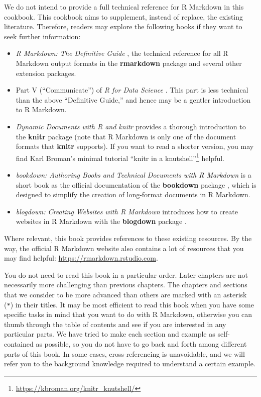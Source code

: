 \documentclass[
  11pt,
]{krantz}
\renewcommand{\href}[2]{#2\footnote{\url{#1}}}
\begin{document}
We do not intend to provide a full technical reference for R Markdown in this cookbook. This cookbook aims to supplement, instead of replace, the existing literature. Therefore, readers may explore the following books if they want to seek further information:

\begin{itemize}
\item
  \emph{R Markdown: The Definitive Guide} \citep{rmarkdown2018}, the technical reference for all R Markdown output formats in the \textbf{rmarkdown} package and several other extension packages.
\item
  Part V (``Communicate'') of \emph{R for Data Science} \citep{wickham2016}. This part is less technical than the above ``Definitive Guide,'' and hence may be a gentler introduction to R Markdown.
\item
  \emph{Dynamic Documents with R and knitr} \citep{knitr2015} provides a thorough introduction to the \textbf{knitr} package \citep{R-knitr} (note that R Markdown is only one of the document formats that \textbf{knitr} supports). If you want to read a shorter version, you may find Karl Broman's minimal tutorial \href{https://kbroman.org/knitr_knutshell/}{``knitr in a knutshell''} helpful.
\item
  \emph{bookdown: Authoring Books and Technical Documents with R Markdown} \citep{bookdown2016} is a short book as the official documentation of the \textbf{bookdown} package \citep{R-bookdown}, which is designed to simplify the creation of long-format documents in R Markdown.
\item
  \emph{blogdown: Creating Websites with R Markdown} \citep{blogdown2017} introduces how to create websites in R Markdown with the \textbf{blogdown} package \citep{R-blogdown}.
\end{itemize}

Where relevant, this book provides references to these existing resources. By the way, the official R Markdown website also contains a lot of resources that you may find helpful: \url{https://rmarkdown.rstudio.com}.

You do not need to read this book in a particular order. Later chapters are not necessarily more challenging than previous chapters. The chapters and sections that we consider to be more advanced than others are marked with an asterisk (\texttt{*}) in their titles. It may be most efficient to read this book when you have some specific tasks in mind that you want to do with R Markdown, otherwise you can thumb through the table of contents and see if you are interested in any particular parts. We have tried to make each section and example as self-contained as possible, so you do not have to go back and forth among different parts of this book. In some cases, cross-referencing is unavoidable, and we will refer you to the background knowledge required to understand a certain example.
\end{document}
